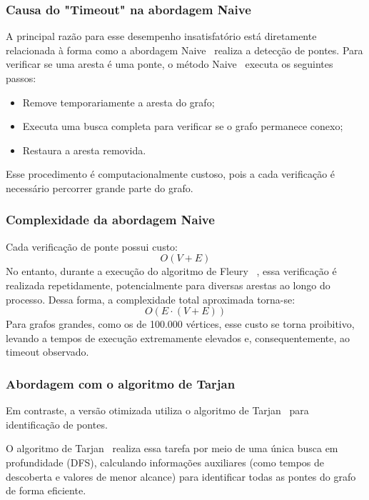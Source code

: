 \documentclass{sbc2023}%
\begin{document}
\subsubsection{Causa do "Timeout" na abordagem Naive}

A principal razão para esse desempenho insatisfatório está diretamente relacionada à forma como a abordagem Naive~\cite{cormen2022Naive} realiza a detecção de pontes. Para verificar se uma aresta é uma ponte, o método Naive~\cite{cormen2022Naive} executa os seguintes passos:

    \begin{itemize}
        \item Remove temporariamente a aresta do grafo;
        \item Executa uma busca completa para verificar se o grafo permanece conexo;
        \item Restaura a aresta removida.
    \end{itemize}

Esse procedimento é computacionalmente custoso, pois a cada verificação é necessário percorrer grande parte do grafo.

\subsubsection{Complexidade da abordagem Naive}

Cada verificação de ponte possui custo: 
$$O(V + E)$$
No entanto, durante a execução do algoritmo de Fleury~\citep{AlgoFleury} , essa verificação é realizada repetidamente, potencialmente para diversas arestas ao longo do processo. Dessa forma, a complexidade total aproximada torna-se:
$$O(E \cdot (V + E))$$
Para grafos grandes, como os de 100.000 vértices, esse custo se torna proibitivo, levando a tempos de execução extremamente elevados e, consequentemente, ao timeout observado.

\subsubsection{Abordagem com o algoritmo de Tarjan}

Em contraste, a versão otimizada utiliza o algoritmo de Tarjan~\cite{tarjan1972dfs} para identificação de pontes.

O algoritmo de Tarjan~\cite{tarjan1972dfs} realiza essa tarefa por meio de uma única busca em profundidade (DFS), calculando informações auxiliares (como tempos de descoberta e valores de menor alcance) para identificar todas as pontes do grafo de forma eficiente.
\end{document}
